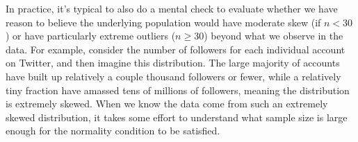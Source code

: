 In practice, it's typical to also do a mental check to evaluate
whether we have reason to believe the underlying population
would have moderate skew (if $n < 30$)
or have particularly extreme outliers ($n \geq 30$)
beyond what we observe in the data.
For example, consider the number of followers
for each individual account on Twitter,
and then imagine this distribution.
The large majority of accounts have built up
relatively a couple thousand followers or fewer,
while a relatively tiny fraction have amassed
tens of millions of followers,
meaning the distribution is extremely skewed.
When we know the data come from such an extremely
skewed distribution,
it takes some effort to understand what sample
size is large enough for the normality condition
to be satisfied.





